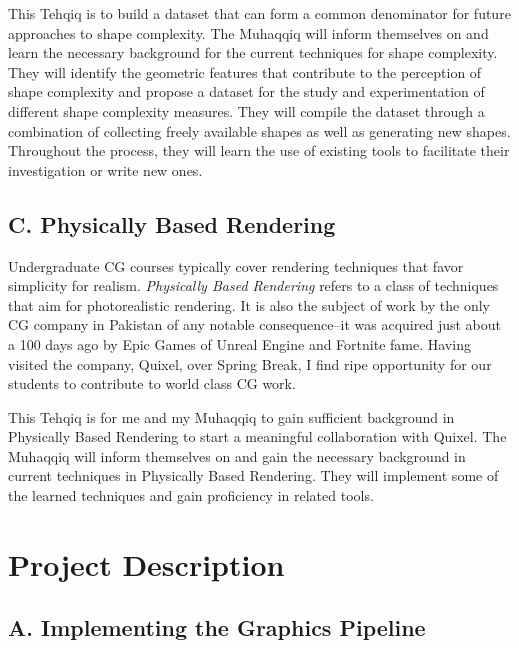\documentclass{article}
\begin{document}
This Tehqiq is to build a dataset that can form a common denominator for future approaches to shape complexity. The Muhaqqiq will inform themselves on and learn the necessary background for the current techniques for shape complexity. They will identify the geometric features that contribute to the perception of shape complexity and propose a dataset for the study and experimentation of different shape complexity measures. They will compile the dataset through a combination of collecting freely available shapes as well as generating new shapes. Throughout the process, they will learn the use of existing tools to facilitate their investigation or write new ones.

\subsection*{C. Physically Based Rendering}

Undergraduate CG courses typically cover rendering techniques that favor simplicity for realism. \textit{Physically Based Rendering} refers to a class of techniques that aim for photorealistic rendering. It is also the subject of work by the only CG company in Pakistan of any notable consequence--it was acquired just about a 100 days ago by Epic Games of Unreal Engine and Fortnite fame. Having visited the company, Quixel, over Spring Break, I find ripe opportunity for our students to contribute to world class CG work.

This Tehqiq is for me and my Muhaqqiq to gain sufficient background in Physically Based Rendering to start a meaningful collaboration with Quixel. The Muhaqqiq will inform themselves on and gain the necessary background in current techniques in Physically Based Rendering. They will implement some of the learned techniques and gain proficiency in related tools.

\newpage

\section{Project Description}


\subsection*{A. Implementing the Graphics Pipeline}
\end{document}
